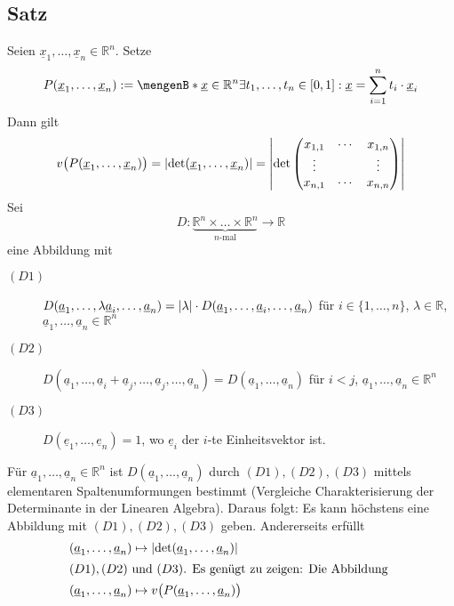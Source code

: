 \subsection[Satz: Volumen eines Parallelotops]{Satz} %
\label{sub:515}
Seien $\underline{x}_1, \ldots , \underline{x}_n \in \mathds{R}^n$. Setze 
\[
	P(\underline{x}_1, \ldots , \underline{x}_n) := \set[\underline{x} \in \mathds{R}^n]{\exists t_1, \ldots , t_n \in [0,1] : \underline{x} = \sum_{i=1}^{n} t_i \cdot \underline{x}_i } 
\]
Dann gilt 
\[
	v\big(P(\underline{x}_1, \ldots , \underline{x}_n)\big) = \abs*{\det \enbrace*{\underline{x}_1, \ldots , \underline{x}_n} } = \abs*{ \det \begin{pmatrix}
		x_{1,1} & \cdots & x_{1,n} \\
		\vdots  & & \vdots  \\
		x_{n,1} & \cdots & x_{n,n}
	\end{pmatrix}} 
\]
Sei 
\[
	D : \underbrace{\mathds{R}^n \times \ldots \times \mathds{R}^n}_{n \text{-mal}} \to \mathds{R} 
\]
eine Abbildung mit 
\begin{description}
	\item[$(D1)$] $D(\underline{a}_1, \ldots , \lambda \underline{a}_i, \ldots , \underline{a}_n) = \abs*{\lambda } \cdot D(\underline{a}_1, \ldots , \underline{a}_i, \ldots , \underline{a}_n) $ für $i \in \{1, \ldots , n\}$, $\lambda  \in \mathds{R}$, $\underline{a}_1, \ldots, \underline{a}_n \in \mathds{R}^n $
	\item[$(D2)$] $D(\underline{a}_1, \ldots , \underline{a}_i+ \underline{a}_j, \ldots , \underline{a}_j, \ldots , \underline{a}_n) = D(\underline{a}_1, \ldots , \underline{a}_n)$ für $i<j$, $\underline{a}_1, \ldots, \underline{a}_n \in \mathds{R}^n $
	\item[$(D3)$] $D(\underline{e}_1, \ldots , \underline{e}_n) = 1$, wo $\underline{e}_i $ der $i$-te Einheitsvektor ist.
\end{description}
Für $\underline{a}_1, \ldots , \underline{a}_n \in \mathds{R}^n$ ist $D(\underline{a}_1, \ldots , \underline{a}_n)$ durch $(D1), (D2), (D3)$ mittels elementaren 
Spaltenumformungen bestimmt (Vergleiche Charakterisierung der Determinante in der Linearen Algebra). Daraus folgt: Es kann höchstens eine Abbildung mit $(D1), (D2), (D3)$
geben. Andererseits erfüllt 
\begin{align*}
	(\underline{a}_1, \ldots , \underline{a}_n) &\mapsto \abs*{\det (\underline{a}_1, \ldots , \underline{a}_n)} \\
	\intertext{$(D1), (D2)$ und $(D3)$. Es genügt zu zeigen: Die Abbildung }
	(\underline{a}_1, \ldots , \underline{a}_n) &\mapsto v\big(P(\underline{a}_1, \ldots , \underline{a}_n)\big)
\end{align*}
